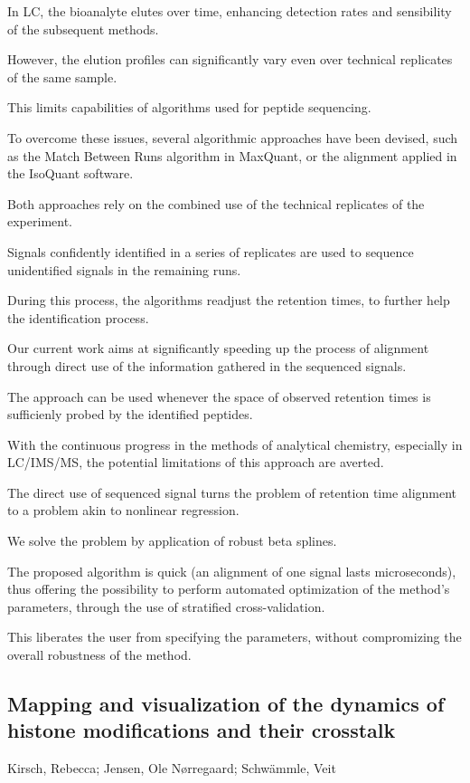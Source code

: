 {In LC, the bioanalyte elutes over time, enhancing detection rates and sensibility of the subsequent methods.

However, the elution profiles can significantly vary even over technical replicates of the same sample.

This limits capabilities of algorithms used for peptide sequencing.

To overcome these issues, several algorithmic approaches have been devised, such as the Match Between Runs algorithm in MaxQuant, or the alignment applied in the IsoQuant software.

Both approaches rely on the combined use of the technical replicates of the experiment.

Signals confidently identified in a series of replicates are used to sequence unidentified signals in the remaining runs.

During this process, the algorithms readjust the retention times, to further help the identification process.

Our current work aims at significantly speeding up the process of alignment through direct use of the information gathered in the sequenced signals.

The approach can be used whenever the space of observed retention times is sufficienly probed by the identified peptides.

With the continuous progress in the methods of analytical chemistry, especially in LC/IMS/MS, the potential limitations of this approach are averted.

The direct use of sequenced signal turns the problem of retention time alignment to a problem akin to nonlinear regression.

We solve the problem by application of robust beta splines.

The proposed algorithm is quick (an alignment of one signal lasts microseconds), thus offering the possibility to perform automated optimization of the method's parameters, through the use of stratified cross-validation.

This liberates the user from specifying the parameters, without compromizing the overall robustness of the method.


\subsection*{\color{eubicRed} Mapping and visualization of the dynamics of histone modifications and their crosstalk}
{\color{eubicGray}Kirsch, Rebecca;
Jensen, Ole Nørregaard;
Schwämmle, Veit}

}
